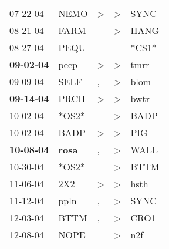 \begin{supertabular}{p{0.07\textwidth}p{0.06\textwidth}p{0.02\textwidth}p{0.02\textwidth}p{0.06\textwidth}}
          07-22-04\textsuperscript{} &           NEMO\textsuperscript{} &     \textgreater &     \textgreater &           SYNC\textsuperscript{} \\
          08-21-04\textsuperscript{} &           FARM\textsuperscript{} &                  &     \textgreater &           HANG\textsuperscript{} \\
          08-27-04\textsuperscript{} &           PEQU\textsuperscript{} &                  &                  &                            *CS1* \\
 \textbf{09-02-04\textsuperscript{}} &           peep\textsuperscript{} &     \textgreater &     \textgreater &           tmrr\textsuperscript{} \\
          09-09-04\textsuperscript{} &           SELF\textsuperscript{} &                , &     \textgreater &           blom\textsuperscript{} \\
 \textbf{09-14-04\textsuperscript{}} &           PRCH\textsuperscript{} &     \textgreater &     \textgreater &           bwtr\textsuperscript{} \\
          10-02-04\textsuperscript{} &                            *OS2* &                  &     \textgreater &           BADP\textsuperscript{} \\
          10-02-04\textsuperscript{} &           BADP\textsuperscript{} &     \textgreater &     \textgreater &            PIG\textsuperscript{} \\
 \textbf{10-08-04\textsuperscript{}} &  \textbf{rosa\textsuperscript{}} &                , &     \textgreater &           WALL\textsuperscript{} \\
          10-30-04\textsuperscript{} &                            *OS2* &                  &     \textgreater &           BTTM\textsuperscript{} \\
          11-06-04\textsuperscript{} &            2X2\textsuperscript{} &     \textgreater &     \textgreater &           hsth\textsuperscript{} \\
          11-12-04\textsuperscript{} &           ppln\textsuperscript{} &                , &     \textgreater &           SYNC\textsuperscript{} \\
          12-03-04\textsuperscript{} &           BTTM\textsuperscript{} &                , &     \textgreater &           CRO1\textsuperscript{} \\
          12-08-04\textsuperscript{} &           NOPE\textsuperscript{} &                  &     \textgreater &            n2f\textsuperscript{} \\

\end{supertabular}
